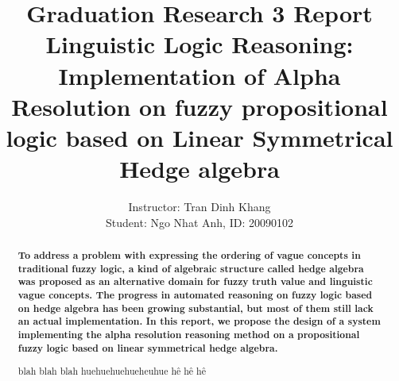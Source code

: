 \documentclass[12pt,fleqn,a4paper]{report}
\date{}
\begin{document}
\title{{\huge Graduation Research 3 Report}\\
Linguistic Logic Reasoning:\\
Implementation of Alpha Resolution on fuzzy propositional logic based on Linear Symmetrical Hedge algebra\\
}
\author{Instructor: Tran Dinh Khang\\Student: Ngo Nhat Anh, ID: 20090102}
\maketitle

%
%

\begin{abstract}
{\bfseries To address a problem with expressing the ordering
	of vague concepts in traditional fuzzy logic, a kind
	of algebraic structure called hedge algebra was
	proposed as an alternative domain for fuzzy truth
	value and linguistic vague concepts. The progress in
	automated reasoning on fuzzy logic based on hedge
	algebra has been growing substantial, but most of
	them still lack an actual implementation. In this
	report, we propose the design of a system implementing 
	the alpha resolution reasoning method
	on a propositional fuzzy logic based on linear
	symmetrical hedge algebra.
}
\end{abstract}

\renewcommand{\abstractname}{VNmese abstract}
\begin{abstract}
blah blah blah huehuehuehueheuhue        
hê hê hê
\end{abstract}
\tableofcontents



\end{document}
